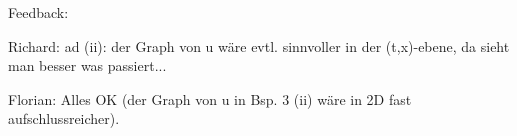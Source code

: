 Feedback:

Richard:
ad (ii): der Graph von u wäre evtl. sinnvoller in der (t,x)-ebene, da sieht man besser was passiert...

Florian:
Alles OK (der Graph von u in Bsp. 3 (ii) wäre in 2D fast aufschlussreicher).
